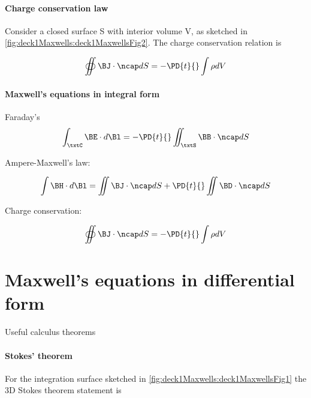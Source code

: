 \paragraph{Charge conservation law}

Consider a closed surface S with interior volume V, as sketched in \cref{fig:deck1Maxwells:deck1MaxwellsFig2}.  The charge conservation relation is


\begin{dmath}\label{eqn:uwavesLecture1:60}
\oiint \BJ \cdot \ncap dS = -\PD{t}{} \int \rho dV
\end{dmath}

\paragraph{Maxwell's equations in integral form}

Faraday's
\begin{dmath}\label{eqn:uwavesLecture1:80}
\int_\txtC \BE \cdot d\Bl = - \PD{t}{} \iint_\txtS \BB \cdot \ncap dS
\end{dmath}

Ampere-Maxwell's law:

\begin{dmath}\label{eqn:uwavesLecture1:100}
\int \BH \cdot d\Bl = \iint \BJ \cdot \ncap dS + \PD{t}{} \iint \BD \cdot \ncap dS
\end{dmath}

Charge conservation:

\begin{dmath}\label{eqn:uwavesLecture1:120}
\oiint \BJ \cdot \ncap dS = -\PD{t}{} \int \rho dV
\end{dmath}

\section{Maxwell's equations in differential form}

Useful calculus theorems

\paragraph{Stokes' theorem}

For the integration surface sketched in \cref{fig:deck1Maxwells:deck1MaxwellsFig1} the 3D Stokes theorem statement is

